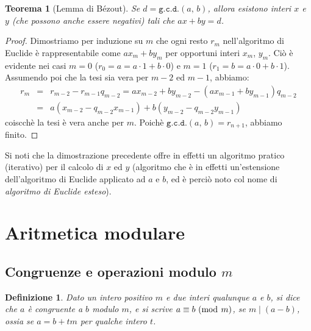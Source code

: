 \documentclass[pdflatex,11pt,a4paper,oneside]{article}
\newcommand{\p}[1]{\left({#1}\right)}
\newcommand{\divides}[0]{\mid}
\newcommand{\congruent}[0]{\equiv}
\newcommand{\mmodop}[0]{\ensuremath{\operatorname{mod}}}
\newcommand{\mmod}[1]{\ensuremath{\allowbreak\ (\mmodop\:{#1})}}
\newcommand{\gcdop}[0]{\ensuremath{\mathtt{g.c.d.}}}
\newcommand{\xgcd}[1]{\ensuremath{\gcdop\left({#1}\right)}}
\renewcommand{\gcd}[2]{\xgcd{{#1},\,{#2}}}
\newtheorem{theorem}[TheoremLike]{Teorema}
\newtheorem{definition}[TheoremLike]{Definizione}
\begin{document}
\begin{theorem}[Lemma di B\'ezout]\label{thm:lemma-bezout}
Se $d = \gcd{a}{b}$, allora esistono interi $x$ e $y$ (che possono
anche essere negativi) tali che $ax + by = d$.
\end{theorem}
%
\begin{proof}
Dimostriamo per induzione su $m$ che ogni resto $r_m$ nell'algoritmo
di Euclide \`e rappresentabile come $ax_m + by_m$ per opportuni interi
$x_m$, $y_m$. Ci\`o \`e evidente nei casi $m = 0$ ($r_0 = a = a \cdot 1 +
b \cdot 0$) e $m = 1$ ($r_1 = b = a \cdot 0 + b \cdot 1$). Assumendo poi
che la tesi sia vera per $m - 2$ ed $m - 1$, abbiamo:
\begin{eqnarray*}
r_m & = & r_{m-2} - r_{m-1} q_{m-2} = ax_{m-2} + by_{m-2} -
                                      \p{ax_{m-1} + by_{m-1}} q_{m-2} \\
& = &
a\p{x_{m-2} - q_{m-2}x_{m-1}} + b\p{y_{m-2} - q_{m-2}y_{m-1}}
\end{eqnarray*}
coiscch\`e la tesi \`e vera anche per $m$.  Poich\`e $\gcd{a}{b} =
r_{n+1}$, abbiamo finito.
\end{proof}

Si noti che la dimostrazione precedente offre in effetti un algoritmo
pratico (iterativo) per il calcolo di  $x$ ed $y$ (algoritmo che \`e in
effetti un'estensione dell'algoritmo di Euclide applicato ad $a$ e $b$,
ed \`e perci\`o noto col nome di \emph{algoritmo di Euclide esteso}).


\section{Aritmetica modulare}


\subsection{Congruenze e operazioni modulo $m$}

\begin{definition}
Dato un intero positivo $m$ e due interi qualunque $a$ e $b$, si dice che
\emph{$a$ \`e congruente a $b$ modulo $m$}, e si scrive $a \congruent b
\mmod m$, se $m \divides \p{a - b}$, ossia se $a = b + tm$ per qualche
intero $t$.
\end{definition}
\end{document}

